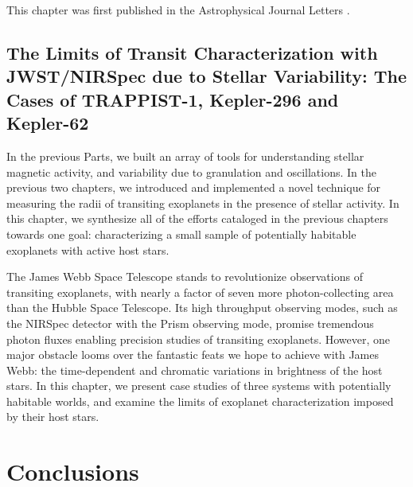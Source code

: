 \documentclass[12pt, twoside]{uwthesis}
\begin{document}
This chapter was first published in the Astrophysical Journal Letters \citep{Morris2018f}.



\chapter{The Limits of Transit Characterization with JWST/NIRSpec due to Stellar Variability: The Cases of TRAPPIST-1, Kepler-296 and Kepler-62} \label{chapter:jwst_nirspc}

In the previous Parts, we built an array of tools for understanding stellar magnetic activity, and variability due to granulation and oscillations. In the previous two chapters, we introduced and implemented a novel technique for measuring the radii of transiting exoplanets in the presence of stellar activity. In this chapter, we synthesize all of the efforts cataloged in the previous chapters towards one goal: characterizing a small sample of potentially habitable exoplanets with active host stars. 

The James Webb Space Telescope stands to revolutionize observations of transiting exoplanets, with nearly a factor of seven more photon-collecting area than the Hubble Space Telescope. Its high throughput observing modes, such as the NIRSpec detector with the Prism observing mode, promise tremendous photon fluxes enabling precision studies of transiting exoplanets. However, one major obstacle looms over the fantastic feats we hope to achieve with James Webb: the time-dependent and chromatic variations in brightness of the host stars. In this chapter, we present case studies of three systems with potentially habitable worlds, and examine the limits of exoplanet characterization imposed by their host stars. 

\part{Conclusions} \label{part:conclusion}



\printendnotes

%
%


\end{document}
